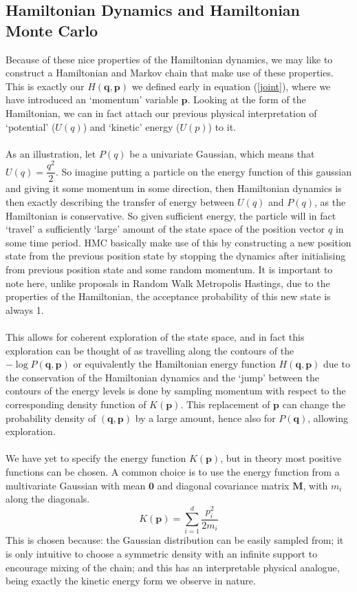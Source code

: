 \documentclass[11pt]{article}
\begin{document}
\subsection{Hamiltonian Dynamics and Hamiltonian Monte Carlo}
Because of these nice properties of the Hamiltonian dynamics, we may like to construct a Hamiltonian and Markov chain that make use of these properties. This is exactly our $H(\mathbf{q},\mathbf{p})$ we defined early in equation (\ref{joint}), where we have introduced an `momentum' variable $\mathbf{p}$. Looking at the form of the Hamiltonian, we can in fact attach our previous physical interpretation of `potential' ($U(q)$) and `kinetic' energy ($U(p)$) to it. 
\\
\\
As an illustration, let $P(q)$ be a univariate Gaussian, which means that $U(q)=\dfrac{q^2}{2}$. So imagine putting a particle on the energy function of this gaussian and giving it some momentum in some direction, then Hamiltonian dynamics is then exactly describing the transfer of energy between $U(q)$ and $P(q)$, as the Hamiltonian is conservative. So given sufficient energy, the particle will in fact `travel' a sufficiently `large' amount of the state space of the position vector $q$ in some time period. HMC basically make use of this by constructing a new position state from the previous position state by stopping the dynamics after initialising from previous position state and some random momentum. It is important to note here, unlike proposals in Random Walk Metropolis Hastings, due to the properties of the Hamiltonian, the acceptance probability of this new state is always 1. 
\\
\\
This allows for coherent exploration of the state space, and in fact this exploration can be thought of as travelling along the contours of the $-\log P(\mathbf{q},\mathbf{p})$ or equivalently the Hamiltonian energy function $H(\mathbf{q},\mathbf{p})$ due to the conservation of the Hamiltonian dynamics and the `jump' between the contours of the energy levels is done by sampling momentum with respect to the corresponding density function of $K(\mathbf{p})$. This replacement of $\mathbf{p}$ can change the probability density of $(\mathbf{q},\mathbf{p})$ by a large amount, hence also for $P(\mathbf{q})$, allowing exploration.
\\
\\
We have yet to specify the energy function $K(\mathbf{p})$, but in theory most positive functions can be chosen. A common choice is to use the energy function from a multivariate Gaussian with mean $\mathbf{0}$ and diagonal covariance matrix $\mathbf{M}$, with $m_{i}$ along the diagonals.
\begin{equation}
K(\mathbf{p}) = \sum_{i=1}^{d} \frac{p_{i}^{2}}{2m_{i}}
\end{equation}
This is chosen because: the Gaussian distribution can be easily sampled from; it is only intuitive to choose a symmetric density with an infinite support to encourage mixing of the chain; and this has an interpretable physical analogue, being exactly the kinetic energy form we observe in nature. 
\end{document}
